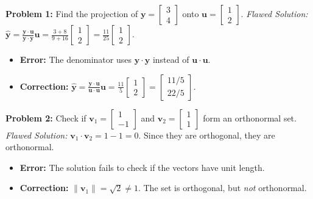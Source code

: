 \documentclass[11pt, letterpaper]{article}
\theoremstyle{definition}
\theoremstyle{remark}
\begin{document}
\textbf{Problem 1:} Find the projection of $\mathbf{y} = \begin{bmatrix} 3 \\ 4 \end{bmatrix}$ onto $\mathbf{u} = \begin{bmatrix} 1 \\ 2 \end{bmatrix}$.
\textit{Flawed Solution:} $\hat{\mathbf{y}} = \frac{\mathbf{y} \cdot \mathbf{u}}{\mathbf{y} \cdot \mathbf{y}} \mathbf{u} = \frac{3+8}{9+16} \begin{bmatrix} 1 \\ 2 \end{bmatrix} = \frac{11}{25} \begin{bmatrix} 1 \\ 2 \end{bmatrix}$.
\begin{itemize}
    \item \textbf{Error:} The denominator uses $\mathbf{y} \cdot \mathbf{y}$ instead of $\mathbf{u} \cdot \mathbf{u}$.
    \item \textbf{Correction:} $\hat{\mathbf{y}} = \frac{\mathbf{y} \cdot \mathbf{u}}{\mathbf{u} \cdot \mathbf{u}} \mathbf{u} = \frac{11}{5} \begin{bmatrix} 1 \\ 2 \end{bmatrix} = \begin{bmatrix} 11/5 \\ 22/5 \end{bmatrix}$.
\end{itemize}

\textbf{Problem 2:} Check if $\mathbf{v}_1 = \begin{bmatrix} 1 \\ -1 \end{bmatrix}$ and $\mathbf{v}_2 = \begin{bmatrix} 1 \\ 1 \end{bmatrix}$ form an orthonormal set.
\textit{Flawed Solution:} $\mathbf{v}_1 \cdot \mathbf{v}_2 = 1 - 1 = 0$. Since they are orthogonal, they are orthonormal.
\begin{itemize}
    \item \textbf{Error:} The solution fails to check if the vectors have unit length.
    \item \textbf{Correction:} $\|\mathbf{v}_1\| = \sqrt{2} \neq 1$. The set is orthogonal, but \textit{not} orthonormal.
\end{itemize}
\end{document}
